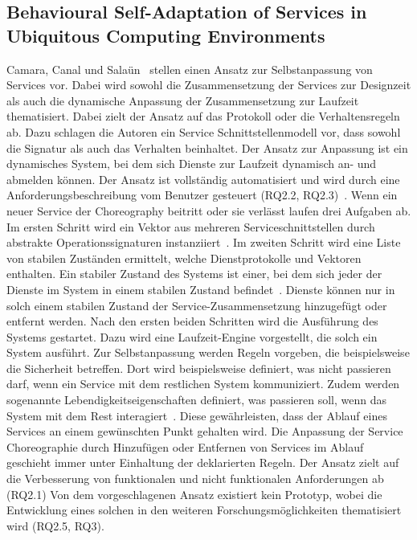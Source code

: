 \documentclass[conference,compsoc,ngerman]{IEEEtran}
\begin{document}
\subsection{Behavioural Self-Adaptation of Services in Ubiquitous Computing Environments}
Camara, Canal und Salaün~\cite{camara2009behavioural} stellen einen Ansatz zur Selbstanpassung von Services vor. Dabei wird sowohl die Zusammensetzung der Services zur Designzeit als auch die dynamische Anpassung der Zusammensetzung zur Laufzeit thematisiert.
Dabei zielt der Ansatz auf das Protokoll oder die Verhaltensregeln ab. Dazu schlagen die Autoren ein Service Schnittstellenmodell vor, dass sowohl die Signatur als auch das Verhalten beinhaltet.
Der Ansatz zur Anpassung ist ein dynamisches System, bei dem sich Dienste zur Laufzeit dynamisch an- und abmelden können. Der Ansatz ist vollständig automatisiert und wird durch eine Anforderungsbeschreibung vom Benutzer gesteuert (RQ2.2, RQ2.3)~\cite{camara2009behavioural}. Wenn ein neuer Service der Choreography beitritt oder sie verlässt laufen drei Aufgaben ab. Im ersten Schritt wird ein Vektor aus mehreren Serviceschnittstellen durch abstrakte Operationssignaturen instanziiert~\cite{camara2009behavioural}. Im zweiten Schritt wird eine Liste von stabilen Zuständen ermittelt, welche Dienstprotokolle und Vektoren enthalten. Ein stabiler Zustand des Systems ist einer, bei dem sich jeder der Dienste im System in einem stabilen Zustand befindet~\cite{camara2009behavioural}. Dienste können nur in solch einem stabilen Zustand der Service-Zusammensetzung hinzugefügt oder entfernt werden. Nach den ersten beiden Schritten wird die Ausführung des Systems gestartet. Dazu wird eine Laufzeit-Engine vorgestellt, die solch ein System ausführt.
Zur Selbstanpassung werden Regeln vorgeben, die beispielsweise die Sicherheit betreffen. Dort wird beispielsweise definiert, was nicht passieren darf, wenn ein Service mit dem restlichen System kommuniziert.
Zudem werden sogenannte Lebendigkeitseigenschaften definiert, was passieren soll, wenn das System mit dem Rest interagiert~\cite{camara2009behavioural}. Diese gewährleisten, dass der Ablauf eines Services an einem gewünschten Punkt gehalten wird. Die Anpassung der Service Choreographie durch Hinzufügen oder Entfernen von Services im Ablauf geschieht immer unter Einhaltung der deklarierten Regeln.
Der Ansatz zielt auf die Verbesserung von funktionalen und nicht funktionalen Anforderungen ab (RQ2.1)
Von dem vorgeschlagenen Ansatz existiert kein Prototyp, wobei die Entwicklung eines solchen in den weiteren Forschungsmöglichkeiten thematisiert wird (RQ2.5, RQ3).
\end{document}
